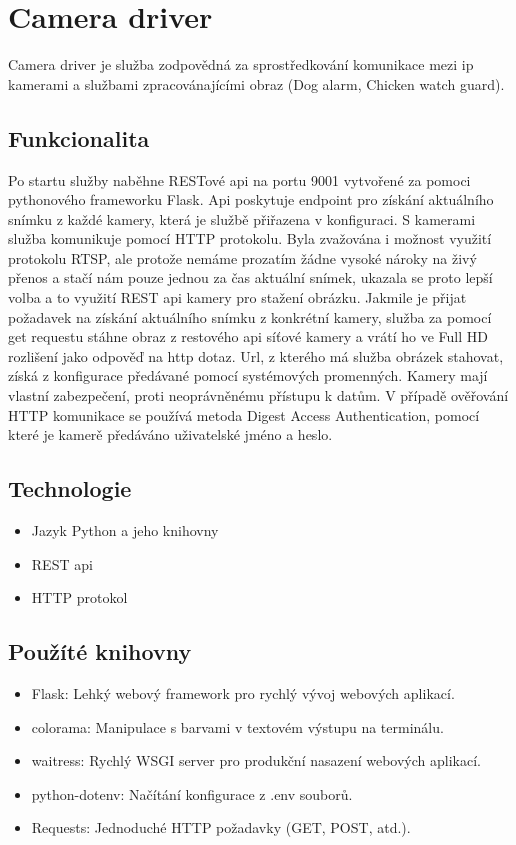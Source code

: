 \section{Camera driver}\label{sec:camera-driver}
Camera driver je služba zodpovědná za sprostředkování komunikace mezi ip kamerami a službami zpracovánajícími obraz (Dog alarm, Chicken watch guard).\newline

\subsection*{Funkcionalita}
Po startu služby naběhne RESTové api na portu 9001 vytvořené za pomoci pythonového frameworku Flask.
Api poskytuje endpoint pro získání aktuálního snímku z každé kamery, která je službě přiřazena v konfiguraci.
S kamerami služba komunikuje pomocí HTTP protokolu.
Byla zvažována i možnost využití protokolu RTSP, ale protože nemáme prozatím žádne vysoké nároky na živý přenos a stačí nám pouze jednou za čas aktuální snímek, ukazala se proto lepší volba a to využití REST api kamery pro stažení obrázku.
Jakmile je přijat požadavek na získání aktuálního snímku z konkrétní kamery, služba za pomocí get requestu stáhne obraz z restového api síťové kamery a vrátí ho ve Full HD rozlišení jako odpověď na http dotaz.
Url, z kterého má služba obrázek stahovat, získá z konfigurace předávané pomocí systémových promenných.
Kamery mají vlastní zabezpečení, proti neoprávněnému přístupu k datům.
V případě ověřování HTTP komunikace se používá metoda Digest Access Authentication, pomocí které je kamerě předáváno uživatelské jméno a heslo.

\subsection*{Technologie}
\begin{itemize}
    \item Jazyk Python a jeho knihovny
    \item REST api
    \item HTTP protokol
\end{itemize}

\subsection*{Použíté knihovny}
\begin{itemize}
    \item Flask: Lehký webový framework pro rychlý vývoj webových aplikací.
    \item colorama: Manipulace s barvami v textovém výstupu na terminálu.
    \item waitress: Rychlý WSGI server pro produkční nasazení webových aplikací.
    \item python-dotenv: Načítání konfigurace z .env souborů.
    \item Requests: Jednoduché HTTP požadavky (GET, POST, atd.).
\end{itemize}

